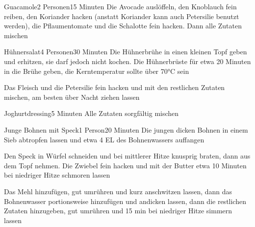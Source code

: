 
\begin{recipe}{Guacamole}{2 Personen}{15 Minuten}
Die Avocade auslöffeln, den Knoblauch fein reiben, den Koriander hacken (anstatt Koriander kann auch Petersilie benutzt werden), die Pflaumentomate und die Schalotte fein hacken. Dann alle Zutaten mischen 
\end{recipe}


\begin{recipe}{Hühnersalat}{4 Personen}{30 Minuten}
Die Hühnerbrühe in einen kleinen Topf geben und erhitzen, sie darf jedoch nicht kochen. Die Hühnerbrüste für etwa 20 Minuten in die Brühe geben, die Kerntemperatur sollte über 70°C sein

Das Fleisch und die Petersilie fein hacken und mit den restlichen Zutaten mischen, am besten über Nacht ziehen lassen
\end{recipe}


\begin{recipe}{Joghurtdressing}{}{5 Minuten}
Alle Zutaten sorgfältig mischen
\end{recipe}


\begin{recipe}{Junge Bohnen mit Speck}{1 Person}{20 Minuten}
Die jungen dicken Bohnen in einem Sieb abtropfen lassen und etwa 4 EL des Bohnenwassers auffangen

Den Speck in Würfel schneiden und bei mittlerer Hitze knusprig braten, dann aus dem Topf nehmen.
Die Zwiebel fein hacken und mit der Butter etwa 10 Minuten bei niedriger Hitze schmoren lassen

Das Mehl hinzufügen, gut umrühren und kurz anschwitzen lassen, dann das Bohnenwasser portionsweise hinzufügen und andicken lassen, dann die restlichen Zutaten hinzugeben, gut umrühren und 15 min bei niedriger Hitze simmern lassen
\end{recipe}

